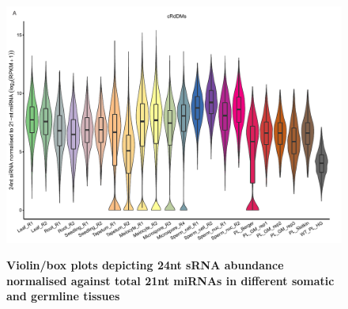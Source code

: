 \begin{figure}[htbp!] 
\centering    
    \includegraphics[width=1\textwidth]{Chapter2/Figs/Supps/FigureS7_miRNA_norm.pdf}
\caption{\textbf{Violin/box plots depicting 24nt sRNA abundance normalised against total 21nt miRNAs in different somatic and germline tissues}}
\label{fig:miRNA_norm}
\captionsetup{font=small}
    \caption*{}
\end{figure}


